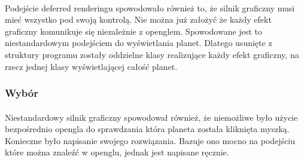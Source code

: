\paragraph{}

Podejście deferred renderingu spowodowało również to, że silnik graficzny musi mieć wszystko pod swoją kontrolą. Nie można już założyć że każdy efekt graficzny komunikuje się niezależnie z openglem. Spowodowane jest to niestandardowym podejściem do wyświetlania planet. Dlatego usunięte z struktury programu zostały oddzielne klasy realizujące każdy efekt graficzny, na rzecz jednej klasy wyświetlającej całość planet.

\subsubsection{Wybór}\label{ssub:klikanie}
\paragraph{}

Niestandardowy silnik graficzny spowodował również, że niemożliwe było użycie bezpośrednio opengla do sprawdzania która planeta została kliknięta myszką. Konieczne było napisanie swojego rozwiązania. Bazuje ono mocno na podejściu które można znaleźć w openglu, jednak jest napisane ręcznie.

